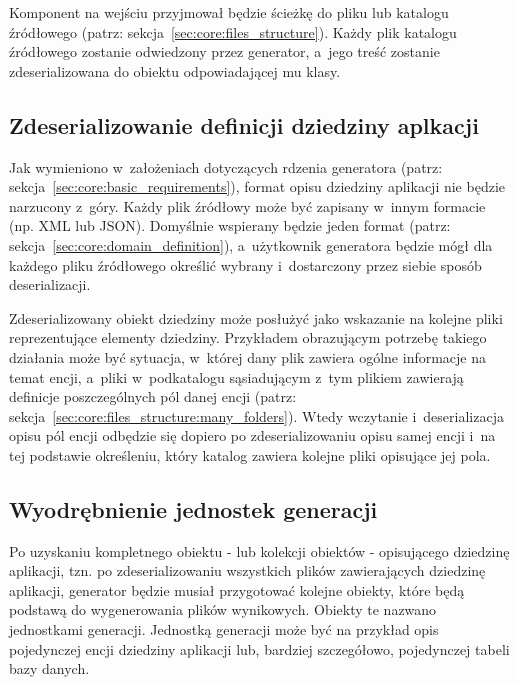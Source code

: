 Komponent na wejściu przyjmował będzie ścieżkę do pliku lub katalogu źródłowego (patrz: sekcja~\ref{sec:core:files_structure}).
Każdy plik katalogu źródłowego zostanie odwiedzony przez generator, a~jego treść zostanie zdeserializowana do obiektu odpowiadającej mu klasy.


\subsection{Zdeserializowanie definicji dziedziny aplkacji}

Jak wymieniono w~założeniach dotyczących rdzenia generatora (patrz: sekcja~\ref{sec:core:basic_requirements}), format opisu dziedziny aplikacji nie będzie narzucony z~góry.
Każdy plik źródłowy może być zapisany w~innym formacie (np. XML lub JSON).
Domyślnie wspierany będzie jeden format (patrz: sekcja~\ref{sec:core:domain_definition}), a~użytkownik generatora będzie mógł dla każdego pliku źródłowego określić wybrany i~dostarczony przez siebie sposób deserializacji.

Zdeserializowany obiekt dziedziny może posłużyć jako wskazanie na kolejne pliki reprezentujące elementy dziedziny.
Przykładem obrazującym potrzebę takiego działania może być sytuacja, w~której dany plik zawiera ogólne informacje na temat encji, a~pliki w~podkatalogu sąsiadującym z~tym plikiem zawierają definicje poszczególnych pól danej encji (patrz: sekcja~\ref{sec:core:files_structure:many_folders}).
Wtedy wczytanie i~deserializacja opisu pól encji odbędzie się dopiero po zdeserializowaniu opisu samej encji i~na tej podstawie określeniu, który katalog zawiera kolejne pliki opisujące jej pola. 


\subsection{Wyodrębnienie jednostek generacji} \label{sec:generation_units}

Po uzyskaniu kompletnego obiektu - lub kolekcji obiektów - opisującego dziedzinę aplikacji, tzn. po zdeserializowaniu wszystkich plików zawierających dziedzinę aplikacji, generator będzie musiał przygotować kolejne obiekty, które będą podstawą do wygenerowania plików wynikowych.
Obiekty te nazwano jednostkami generacji.
Jednostką generacji może być na przykład opis pojedynczej encji dziedziny aplikacji lub, bardziej szczegółowo, pojedynczej tabeli bazy danych.

